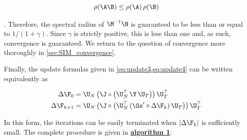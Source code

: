\begin{equation}
    \label{eq:psd}
    \rho(\A\B) \leq \rho(\A) \, \rho(\B)
\end{equation}

\citep{Bhatia1997}. Therefore, the spectral radius of $\M^{-1}\N$ is guaranteed to be less than or equal to $1 / (1 + \gamma)$.  Since $\gamma$ is strictly positive, this is less than one and, as such, convergence is guaranteed. We return to the question of convergence more thoroughly in \cref{sec:SIM_convergence}. 

Finally, the update formulas given in \cref{eq:update3,eq:update4} can be written equivalently as 

\begin{align}
    \Delta \F_0     & = \U_N \, \big( \J  \circ \big( \U_N^\top \, \Y \, \U_T \big) \big) \, \U_T^\top \notag                 \\
    \Delta \F_{k+1} & = \U_N \, \big( \J  \circ \big( \U_N^\top \, (\Ss' \circ \Delta \F_{k})\, \U_T \big) \big) \, \U_T^\top
\end{align}

In this form, the iterations can be easily terminated when $|\Delta \F_{k}|$ is sufficiently small. The complete procedure is given in \hyperlink{al1}{\textbf{algorithm 1}}.


